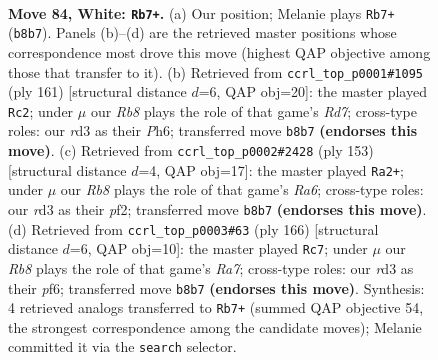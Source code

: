 \documentclass[11pt]{article}
\begin{document}
\clearpage

\begin{figure}[p]\centering
\begin{subfigure}{0.46\textwidth}\centering
\resizebox{\linewidth}{!}{%
\newchessgame
\chessboard[
  setfen={1R6/5k2/8/6K1/r6P/3r4/8/8 w - - 9 84},
  showmover=false,
  pgfstyle=straightmove, color=movearrow, markmove={b8-b7}
]}
\caption{}
\end{subfigure}\hfill
\begin{subfigure}{0.46\textwidth}\centering
\resizebox{\linewidth}{!}{%
\newchessgame
\chessboard[
  setfen={8/8/7p/8/6k1/R6p/3r4/7K b - - 3 81},
  showmover=false,
  pgfstyle=straightmove, color=movearrow, markmove={d2-c2}
]}
\caption{}
\end{subfigure}
\\[4pt]
\begin{subfigure}{0.46\textwidth}\centering
\resizebox{\linewidth}{!}{%
\newchessgame
\chessboard[
  setfen={8/8/2p4R/3k4/8/r7/2K2P2/8 b - - 4 77},
  showmover=false,
  pgfstyle=straightmove, color=movearrow, markmove={a3-a2}
]}
\caption{}
\end{subfigure}\hfill
\begin{subfigure}{0.46\textwidth}\centering
\resizebox{\linewidth}{!}{%
\newchessgame
\chessboard[
  setfen={8/R7/5p1k/8/3r2P1/5K2/8/8 w - - 63 84},
  showmover=false,
  pgfstyle=straightmove, color=movearrow, markmove={a7-c7}
]}
\caption{}
\end{subfigure}
\caption{\textbf{Move 84, White: \texttt{Rb7+}.} (a) Our position; Melanie plays \texttt{Rb7+} (\texttt{b8b7}). Panels (b)--(d) are the retrieved master positions whose correspondence most drove this move (highest QAP objective among those that transfer to it). (b) Retrieved from \texttt{ccrl\_top\_p0001\#1095} (ply 161) [structural distance $d$=6, QAP obj=20]: the master played \texttt{Rc2}; under $\mu$ our \emph{Rb8} plays the role of that game's \emph{Rd7}; cross-type roles: our \emph{r}d3 as their \emph{P}h6; transferred move \texttt{b8b7} \textbf{(endorses this move)}. (c) Retrieved from \texttt{ccrl\_top\_p0002\#2428} (ply 153) [structural distance $d$=4, QAP obj=17]: the master played \texttt{Ra2+}; under $\mu$ our \emph{Rb8} plays the role of that game's \emph{Ra6}; cross-type roles: our \emph{r}d3 as their \emph{p}f2; transferred move \texttt{b8b7} \textbf{(endorses this move)}. (d) Retrieved from \texttt{ccrl\_top\_p0003\#63} (ply 166) [structural distance $d$=6, QAP obj=10]: the master played \texttt{Rc7}; under $\mu$ our \emph{Rb8} plays the role of that game's \emph{Ra7}; cross-type roles: our \emph{r}d3 as their \emph{p}f6; transferred move \texttt{b8b7} \textbf{(endorses this move)}. Synthesis: 4 retrieved analogs transferred to \texttt{Rb7+} (summed QAP objective 54, the strongest correspondence among the candidate moves); Melanie committed it via the \texttt{search} selector.}
\label{fig:thought-m166}
\end{figure}
\end{document}

